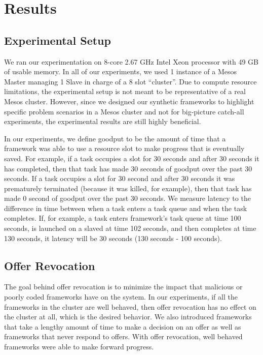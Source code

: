 \section{Results}
\label{sec:results}



\subsection{Experimental Setup}
We ran our experimentation on 8-core 2.67 GHz Intel Xeon processor with 49 GB of usable memory. In all of
our experiments, we used 1 instance of a Mesos Master managing 1 Slave in charge of a 8 slot ``cluster''.
Due to compute resource limitations, the experimental setup is not meant to be representative of a real
Mesos cluster. However, since we designed our synthetic frameworks to highlight specific problem
scenarios in a Mesos cluster and not for big-picture catch-all experiments, the experimental results are
still highly beneficial.

In our experiments, we define goodput to be the amount of time that a framework was able to use a
resource slot to make progress that is eventually saved. For example, if a task occupies a slot for
30 seconds and after 30 seconds it has completed, then that task has made 30 seconds of goodput over
the past 30 seconds. If a task occupies a slot for 30 second and after 30 seconds it was prematurely
terminated (because it was killed, for example), then that task has made 0 second of goodput over the
past 30 seconds. We measure latency to the difference in time between when a task enters a task queue
and when the task completes. If, for example, a task enters framework's task queue at time 100 seconds,
is launched on a slaved at time 102 seconds, and then completes at time 130 seconds, it latency will be
30 seconds (130 seconds - 100 seconds). 

\subsection{Offer Revocation}
The goal behind offer revocation is to minimize the impact that malicious or poorly coded frameworks
have on the system. In our experiments, if all the frameworks in the cluster are well behaved, then
offer revocation has no effect on the cluster at all, which is the desired behavior. We also introduced
frameworks that take a lengthy amount of time to make a decision on an offer as well as frameworks that
never respond to offers. With offer revocation, well behaved frameworks were able to make forward
progress.

